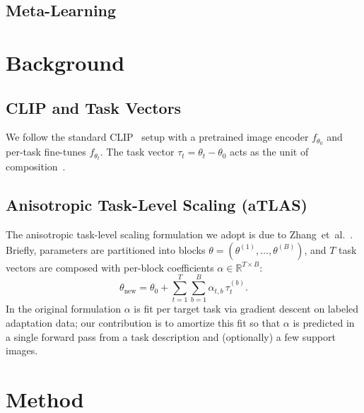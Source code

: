 \documentclass{article}
\begin{document}
\subsection{Meta-Learning}

\section{Background}

\subsection{CLIP and Task Vectors}
We follow the standard CLIP~\cite{radfordLearningTransferableVisual2021}
setup with a pretrained image encoder $f_{\theta_0}$ and per-task
fine-tunes $f_{\theta_t}$. The task vector $\tau_t = \theta_t - \theta_0$
acts as the unit of composition~\cite{ilharcoEditingModelsTask2022}.

\subsection{Anisotropic Task-Level Scaling (aTLAS)}
The anisotropic task-level scaling formulation we adopt is due to
Zhang~et~al.~\cite{zhangKnowledgeCompositionUsing2024}. Briefly, parameters
are partitioned into blocks $\theta = (\theta^{(1)}, \ldots, \theta^{(B)})$,
and $T$ task vectors are composed with per-block coefficients
$\alpha \in \mathbb{R}^{T \times B}$:
\[
\theta_{\text{new}} = \theta_0 + \sum_{t=1}^{T} \sum_{b=1}^{B}
\alpha_{t,b}\, \tau_t^{(b)}.
\]
In the original formulation $\alpha$ is fit per target task via gradient
descent on labeled adaptation data; our contribution is to amortize this
fit so that $\alpha$ is predicted in a single forward pass from a task
description and (optionally) a few support images.

\section{Method}
\end{document}
